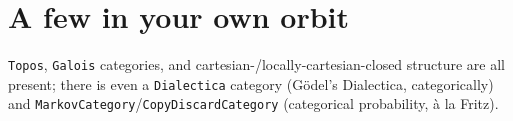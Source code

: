 \documentclass[11pt]{article}
\newcommand{\code}[1]{\texttt{#1}}
\begin{document}
\section*{A few in your own orbit}
\code{Topos}, \code{Galois} categories, and cartesian-/locally-cartesian-closed
structure are all present; there is even a \code{Dialectica} category (Gödel's
Dialectica, categorically) and \code{MarkovCategory}/\code{CopyDiscardCategory}
(categorical probability, à la Fritz).
\end{document}
